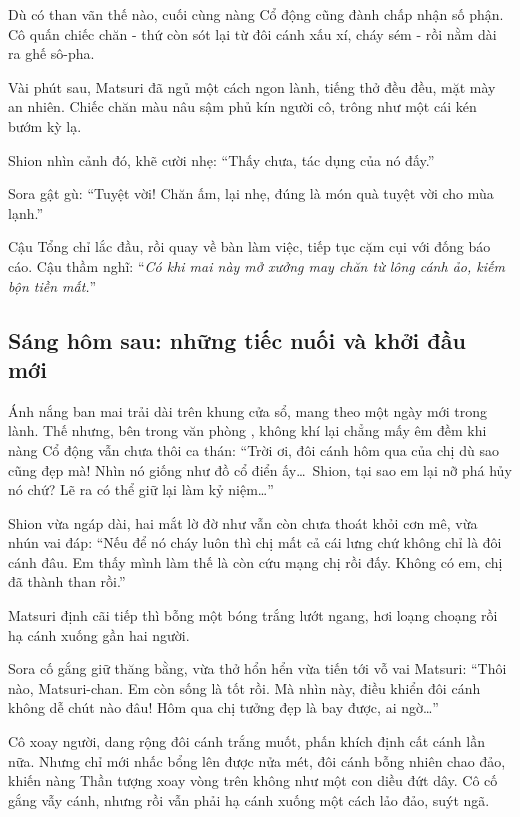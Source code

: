 \documentclass[../main.tex]{subfiles}
\begin{document}
Dù có than vãn thế nào, cuối cùng nàng Cổ động cũng đành chấp nhận số phận. Cô quấn chiếc chăn - thứ còn sót lại từ đôi cánh xấu xí, cháy sém - rồi nằm dài ra ghế sô-pha.

Vài phút sau, Matsuri đã ngủ một cách ngon lành, tiếng thở đều đều, mặt mày an nhiên. Chiếc chăn màu nâu sậm phủ kín người cô, trông như một cái kén bướm kỳ lạ.

Shion nhìn cảnh đó, khẽ cười nhẹ: ``Thấy chưa, tác dụng của nó đấy.''

Sora gật gù: ``Tuyệt vời! Chăn ấm, lại nhẹ, đúng là món quà tuyệt vời cho mùa lạnh.''

Cậu Tổng chỉ lắc đầu, rồi quay về bàn làm việc, tiếp tục cặm cụi với đống báo cáo. Cậu thầm nghĩ: ``\textit{Có khi mai này mở xưởng may chăn từ lông cánh ảo, kiếm bộn tiền mất.}''


\omk

\subsection*{Sáng hôm sau: những tiếc nuối và khởi đầu mới}
Ánh nắng ban mai trải dài trên khung cửa sổ, mang theo một ngày mới trong lành. Thế nhưng, bên trong văn phòng \hll, không khí lại chẳng mấy êm đềm khi nàng Cổ động vẫn chưa thôi ca thán: ``Trời ơi, đôi cánh hôm qua của chị dù sao cũng đẹp mà! Nhìn nó giống như đồ cổ điển ấy\dots\ Shion, tại sao em lại nỡ phá hủy nó chứ? Lẽ ra có thể giữ lại làm kỷ niệm\dots''

Shion vừa ngáp dài, hai mắt lờ đờ như vẫn còn chưa thoát khỏi cơn mê, vừa nhún vai đáp: ``Nếu để nó cháy luôn thì chị mất cả cái lưng chứ không chỉ là đôi cánh đâu. Em thấy mình làm thế là còn cứu mạng chị rồi đấy. Không có em, chị đã thành than rồi.''

Matsuri định cãi tiếp thì bỗng một bóng trắng lướt ngang, hơi loạng choạng rồi hạ cánh xuống gần hai người.

Sora cố gắng giữ thăng bằng, vừa thở hổn hển vừa tiến tới vỗ vai Matsuri: ``Thôi nào, Matsuri-chan. Em còn sống là tốt rồi. Mà nhìn này, điều khiển đôi cánh không dễ chút nào đâu! Hôm qua chị tưởng đẹp là bay được, ai ngờ\dots''

Cô xoay người, dang rộng đôi cánh trắng muốt, phấn khích định cất cánh lần nữa. Nhưng chỉ mới nhấc bổng lên được nửa mét, đôi cánh bỗng nhiên chao đảo, khiến nàng Thần tượng xoay vòng trên không như một con diều đứt dây. Cô cố gắng vẫy cánh, nhưng rồi vẫn phải hạ cánh xuống một cách lảo đảo, suýt ngã.
\end{document}

